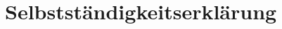 \documentclass[12pt]{article} %
\begin{document}
\newpage


\listofattachments %

\newpage

\begin{attachment} %
    \lipsum[4] %
\end{attachment}

\begin{attachment} %
    \begin{customlistof}{0cm}{} %
        \lipsum[5] %
    \end{customlistof}
\end{attachment}

\thispagestyle{empty} %
\section*{Selbstständigkeitserklärung} %
\end{document}
